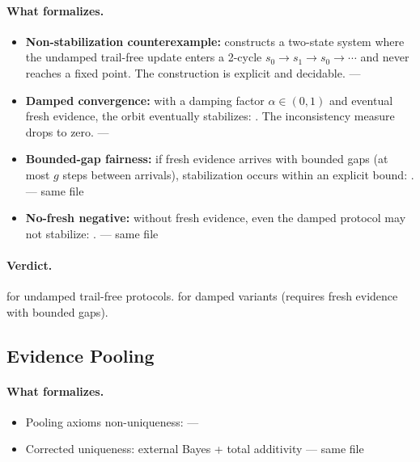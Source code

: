 \documentclass[11pt,openany]{report}
\begin{document}
\paragraph{What formalizes.}
\begin{itemize}
\item \textbf{Non-stabilization counterexample:}
   constructs a two-state system
  where the undamped trail-free update enters a 2-cycle
  $s_0 \to s_1 \to s_0 \to \cdots$ and never reaches a fixed point.
  The construction is explicit and decidable. ---
\item \textbf{Damped convergence:} with a damping factor
  $\alpha \in (0,1)$ and eventual fresh evidence, the orbit
  eventually stabilizes:
  .
  The inconsistency measure drops to zero. ---
\item \textbf{Bounded-gap fairness:} if fresh evidence arrives with
  bounded gaps (at most $g$ steps between arrivals), stabilization
  occurs within an explicit bound:
  . ---
  same file
\item \textbf{No-fresh negative:} without fresh evidence, even the
  damped protocol may not stabilize:
  . ---
  same file
\end{itemize}

\paragraph{Verdict.}
\verdictNoGo{} for undamped trail-free protocols.
\verdictAssumption{} for damped variants (requires fresh evidence
with bounded gaps).

\subsection{Evidence Pooling}

\paragraph{What formalizes.}
\begin{itemize}
\item Pooling axioms non-uniqueness:
   ---
\item Corrected uniqueness: external Bayes + total additivity ---
  same file
\end{itemize}
\end{document}
